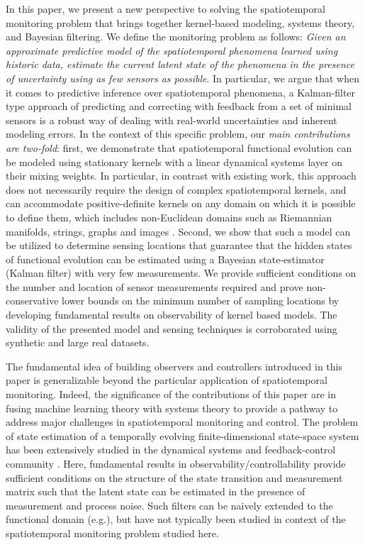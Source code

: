 In this paper, we present a new perspective to solving the spatiotemporal monitoring problem that brings together kernel-based modeling, systems theory, and Bayesian filtering. We define the monitoring problem as follows: \textit{Given an approximate predictive model of the spatiotemporal phenomena learned using historic data, estimate the current latent state of the phenomena in the presence of uncertainty using as few sensors as possible}. In particular, we argue that when it comes to predictive inference over spatiotemporal phenomena, a Kalman-filter type approach of predicting and correcting with feedback from a set of minimal sensors is a robust way of dealing with real-world uncertainties and inherent modeling errors.  In the context of this specific problem, our \textit{main contributions are two-fold}: first, we demonstrate that spatiotemporal functional evolution can be modeled using stationary kernels with a linear dynamical systems layer on their mixing weights. In particular, in contrast with existing work, this approach does not necessarily require the design of complex spatiotemporal kernels, and can accommodate positive-definite kernels on any domain on which it is possible to define them, which includes non-Euclidean domains such as Riemannian manifolds, strings, graphs and images \cite{Jayasumana_PAMI2015_RBFs}. Second, we show that such a model can be utilized to determine sensing locations that guarantee that the hidden states of functional evolution can be estimated using a Bayesian state-estimator (Kalman filter) with very few measurements. We provide sufficient conditions on the number and location of sensor measurements required and prove non-conservative lower bounds on the minimum number of sampling locations by developing fundamental results on observability of kernel based models. The validity of the presented model and sensing techniques is corroborated using synthetic and large real datasets.

The fundamental idea of building observers and controllers introduced in this paper is generalizable beyond the particular application of spatiotemporal monitoring. Indeed, the significance of the contributions of this paper are in fusing machine learning theory with systems theory to provide a pathway to address major challenges in spatiotemporal monitoring and control. The problem of state estimation of a temporally evolving finite-dimensional state-space system has been extensively studied in the dynamical systems and feedback-control community \cite{Gelb74}. Here, fundamental results in observability/controllability provide sufficient conditions on the structure of the state transition and measurement matrix such that the latent state can be estimated in the presence of measurement and process noise. %
Such filters can be naively extended to the functional domain (e.g.\cite{mardia1998kriged}), but have not typically been studied in context of the spatiotemporal monitoring problem studied here. 

